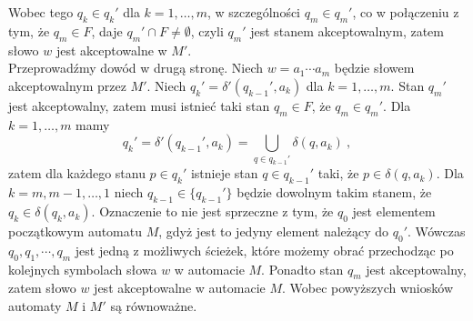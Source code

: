 Wobec tego $q_k\in q_k'$ dla $k=1,\dotsc,m$, w szczególności $q_m\in q_m'$, co w połączeniu z tym, że $q_m\in F$, daje $q_m'\cap F\neq\emptyset$, czyli $q_m'$ jest stanem akceptowalnym, zatem słowo $w$ jest akceptowalne w $M'$.\\
Przeprowadźmy dowód w drugą stronę. Niech $w=a_1\dotsm a_m$ będzie słowem akceptowalnym przez $M'$. Niech $q_k'=\delta'(q_{k-1}',a_k)$ dla $k=1,\dotsc,m$. Stan $q_m'$ jest akceptowalny, zatem musi istnieć taki stan $q_m\in F$, że $q_m\in q_m'$. Dla $k=1,\dotsc,m$ mamy
$$q_k'=\delta'(q_{k-1}',a_k)=\bigcup_{q\in q_{k-1}'}{\delta(q,a_k)}~,$$
zatem dla każdego stanu $p\in q_k'$ istnieje stan $q\in q_{k-1}'$ taki, że $p\in\delta(q,a_k)$. Dla $k=m,m-1,\dotsc,1$ niech $q_{k-1}\in\{q_{k-1}'\}$ będzie dowolnym takim stanem, że $q_k\in\delta(q_k,a_k)$. Oznaczenie to nie jest sprzeczne z tym, że $q_0$ jest elementem początkowym automatu $M$, gdyż jest to jedyny element należący do $q_0'$. Wówczas $q_0,q_1,\cdots,q_m$ jest jedną z możliwych ścieżek, które możemy obrać przechodząc po kolejnych symbolach słowa $w$ w automacie $M$. Ponadto stan $q_m$ jest akceptowalny, zatem słowo $w$ jest akceptowalne w automacie $M$. Wobec powyższych wniosków automaty $M$ i $M'$ są równoważne.

